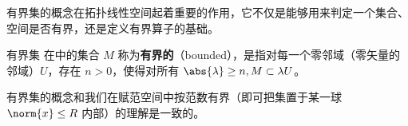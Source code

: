 
有界集的概念在拓扑线性空间起着重要的作用，它不仅是能够用来判定一个集合、空间是否有界，还是定义有界算子的基础。

\begin{definition}{有界集}
在中的集合 $M$ 称为\textbf{有界的}（bounded），是指对每一个零邻域（零矢量的邻域）$U$，存在 $n>0$，使得对所有 $\abs{\lambda}\geq n,M\subset \lambda U$。 
\end{definition}
有界集的概念和我们在赋范空间中按范数有界（即可把集置于某一球 $\norm{x}\leq R$ 内部）的理解是一致的。




